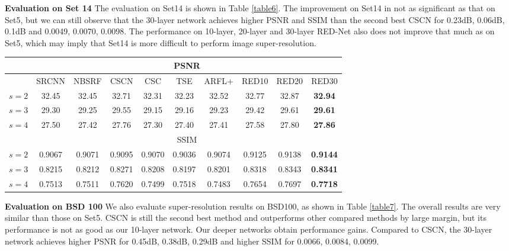 {\bf{Evaluation on Set 14}} The evaluation on Set14 is shown in Table \ref{table6}.
The improvement on Set14 in not as significant as that on Set5, but we can still
observe that the 30-layer network achieves higher PSNR and SSIM than the second
best CSCN for 0.23dB, 0.06dB, 0.1dB and 0.0049, 0.0070, 0.0098. The performance
on 10-layer, 20-layer and 30-layer RED-Net also does not improve that much as on
Set5, which may imply that Set14 is more difficult to perform image super-resolution.

\begin{table*}[htb!]
\centering
%
\caption{Average PSNR and SSIM results of scaling 2, 3 and 4 on Set14.}
\begin{tabular}{c|c c c c c c c c c}  \hline
              &\multicolumn{9}{c}{PSNR}            \\ \hline
           &SRCNN  &NBSRF  &CSCN   &CSC    &TSE    &ARFL+   &RED10    &RED20   &RED30           \\ \hline
  $s = 2$  &32.45  &32.45  &32.71  &32.31  &32.23  &32.52   &32.77    &32.87   &\textbf{32.94}  \\ \hline
  $s = 3$  &29.30  &29.25  &29.55  &29.15  &29.16  &29.23   &29.42    &29.61   &\textbf{29.61}  \\ \hline
  $s = 4$  &27.50  &27.42  &27.76  &27.30  &27.40  &27.41   &27.58    &27.80   &\textbf{27.86}  \\ \hline
              &\multicolumn{9}{c}{SSIM}            \\ \hline
  $s = 2$  &0.9067 &0.9071 &0.9095 &0.9070 &0.9036 &0.9074 &0.9125    &0.9138  &\textbf{0.9144} \\ \hline
  $s = 3$  &0.8215 &0.8212 &0.8271 &0.8208 &0.8197 &0.8201 &0.8318    &0.8343  &\textbf{0.8341} \\ \hline
  $s = 4$  &0.7513 &0.7511 &0.7620 &0.7499 &0.7518 &0.7483 &0.7654    &0.7697  &\textbf{0.7718} \\ \hline
\end{tabular}
\label{table6}
\end{table*}

{\bf{Evaluation on BSD 100}} We also evaluate super-resolution results on BSD100,
as shown in Table \ref{table7}. The overall results are very similar than those on Set5.
CSCN is still the second best method and outperforms other compared methods by large
margin, but its performance is not as good as our 10-layer network. Our deeper networks
obtain performance gains. Compared to CSCN, the 30-layer network achieves higher
PSNR for 0.45dB, 0.38dB, 0.29dB and higher SSIM for 0.0066, 0.0084, 0.0099.

